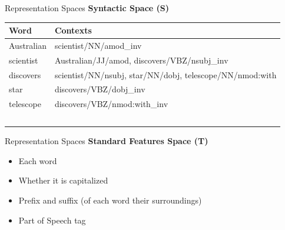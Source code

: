 \documentclass[10pt,xcolor=table]{beamer}
\begin{document}
\begin{frame}{Representation Spaces}
	\large \textbf{Syntactic Space (S)}
	\vspace{1cm}
	\small
	
	
	\begin{tabular}{ll}
	\hline 
	 Word & Contexts \\ 
	\hline 
	Australian & scientist/NN/amod\_inv \\ 
	scientist  &  Australian/JJ/amod, discovers/VBZ/nsubj\_inv\\ 
	discovers & scientist/NN/nsubj, star/NN/dobj, telescope/NN/nmod:with \\ 
	star & discovers/VBZ/dobj\_inv \\ 
	telescope  &  discovers/VBZ/nmod:with\_inv \\ 
	\hline \
	\end{tabular} 
	 
	\vspace{\textheight}
\end{frame}



\begin{frame}{Representation Spaces}
	\large \textbf{Standard Features Space (T)}
	\vspace{1cm}
	\begin{itemize}
		\item Each word
		\item Whether it is capitalized
		\item Prefix and suffix (of each word their surroundings)
		\item Part of Speech tag
	\end{itemize}	 
	\vspace{\textheight}
\end{frame}
\end{document}
